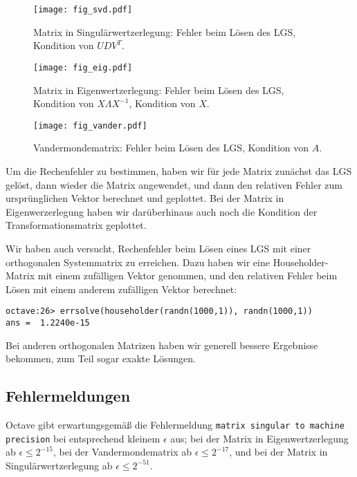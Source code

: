 \documentclass{scrartcl}
\begin{document}
\begin{figure}[!htb]
\centering
\texttt{[image: fig\_svd.pdf]}
\caption{Matrix in Singulärwertzerlegung: Fehler beim Lösen des LGS, Kondition von \(UDV^T\). }
\label{fig:svd}
\end{figure}

\begin{figure}[!htb]
\centering
\texttt{[image: fig\_eig.pdf]}
\caption{Matrix in Eigenwertzerlegung: Fehler beim Lösen des LGS, Kondition von \(X \Lambda X^{-1}\), Kondition von \(X\). }
\label{fig:eig}
\end{figure}

\begin{figure}[!htb]
\centering
\texttt{[image: fig\_vander.pdf]}
\caption{Vandermondematrix: Fehler beim Lösen des LGS, Kondition von \(A\). }
\label{fig:vander}
\end{figure}

Um die Rechenfehler zu bestimmen, haben wir für jede Matrix zunächst das LGS
gelöst, dann wieder die Matrix angewendet, und dann den relativen Fehler zum
ursprünglichen Vektor berechnet und geplottet.  Bei der Matrix in
Eigenwerzerlegung haben wir darüberhinaus auch noch die Kondition der
Transformationsmatrix geplottet.

Wir haben auch versucht, Rechenfehler beim Lösen eines LGS mit einer
orthogonalen Systemmatrix zu erreichen.  Dazu haben wir eine Householder-Matrix
mit einem zufälligen Vektor genommen, und den relativen Fehler beim Lösen mit
einem anderem zufälligen Vektor berechnet:

\begin{verbatim}
octave:26> errsolve(householder(randn(1000,1)), randn(1000,1))
ans =  1.2240e-15
\end{verbatim}

Bei anderen orthogonalen Matrizen haben wir generell bessere Ergebnisse
bekommen, zum Teil sogar exakte Lösungen.

\subsection{Fehlermeldungen}

Octave gibt erwartungsgemäß die Fehlermeldung \texttt{matrix singular to
machine precision} bei entsprechend kleinem \(\epsilon\) aus; bei der Matrix in
Eigenwertzerlegung ab \(\epsilon \leq 2^{-15}\), bei der Vandermondematrix ab
\(\epsilon \leq 2^{-17}\), und bei der Matrix in Singulärwertzerlegung ab
\(\epsilon \leq 2^{-51}\).
\end{document}
